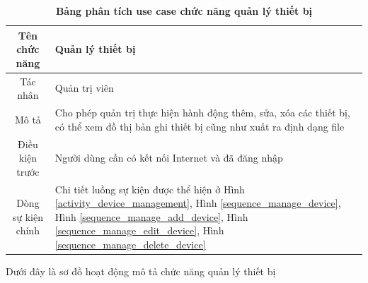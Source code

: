   \begin{table}[H]
    \caption{\bfseries \fontsize{12pt}{0pt}\selectfont Bảng phân tích use case chức năng quản lý thiết bị}
    \centering
    \begin{tabularx}{0.9\textwidth}{|c|X|}
      \hline
      \textbf{Tên chức năng} & \textbf{Quản lý thiết bị} \\
      \hline
      Tác nhân & Quản trị viên \\
      \hline
      Mô tả & Cho phép quản trị thực hiện hành động thêm, sửa, xóa các thiết bị, có thể xem đồ thị bản ghi thiết bị cũng như
      xuất ra định dạng file \\
      \hline
      Điều kiện trước & Người dùng cần có kết nối Internet và đã đăng nhập \\
      \hline
      Dòng sự kiện chính & 
        Chi tiết luồng sự kiện được thể hiện ở Hình \ref{activity_device_management}, Hình \ref{sequence_manage_device}, 
        Hình \ref{sequence_manage_add_device},  Hình \ref{sequence_manage_edit_device}, Hình \ref{sequence_manage_delete_device}
        \\
      \hline
    \end{tabularx}
  \end{table}
  Dưới đây là sơ đồ hoạt động mô tả chức năng quản lý thiết bị
